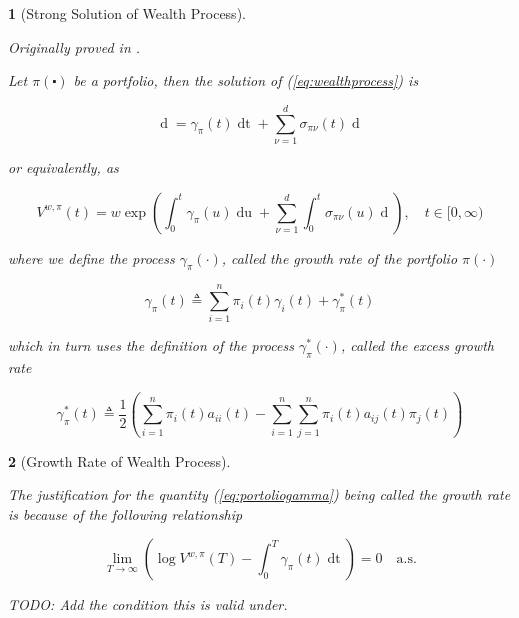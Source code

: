 \documentclass[british]{amsart}
\numberwithin{equation}{section}
\numberwithin{figure}{section}
\theoremstyle{plain}
\newtheorem{thm}{\protect\theoremname}[section]
\theoremstyle{definition}
\theoremstyle{plain}
\theoremstyle{plain}
\theoremstyle{plain}
\newtheorem{prop}[thm]{\protect\propositionname}
\theoremstyle{remark}
\theoremstyle{plain}
\providecommand{\propositionname}{Proposition}
\providecommand{\theoremname}{Theorem}
\renewcommand{\d}[1]{\mathop{\mathrm{d}{#1}}}
\newcommand{\ranget}{t\in[0,\infty)}
\newcommand{\defeq}{\mathop{\triangleq}}
\newcommand{\almostsurely}{\text{a.s.}}
\begin{document}
\begin{prop} [Strong Solution of Wealth Process]
	\label{prop:solutionofwealthprocess}

	Originally proved in \cite{fernholz1999}. 

	Let $\pi(\centerdot)$ be a portfolio, then the solution of (\ref{eq:wealthprocess}) is

	\begin{equation}
		\d{V^{w,\pi}(t)} =  
				\gamma_{\pi}(t) \d{t} +
				\sum_{\nu=1}^{d} \sigma_{\pi\nu}(t) \d{W_{\nu}(t)}
	\end{equation}

	or equivalently, as

	\begin{equation}
		V^{w,\pi}(t) = w \exp{ 
			\left(
				\int_{0}^{t} \gamma_{\pi}(u) \d{u} +
				\sum_{\nu=1}^{d} \int_{0}^{t} \sigma_{\pi\nu}(u) \d{W_{\nu}(u)}
			\right)},
	\quad \ranget
	\end{equation}

	where we define the process $\gamma_{\pi}(\cdot)$, called the \textit{growth rate} of the 
	portfolio $\pi(\cdot)$

	\begin{equation}
		\label{eq:portfoliogamma}
		\gamma_{\pi}(t) \defeq \sum_{i=1}^{n} \pi_{i}(t)\gamma_{i}(t) + \gamma_{\pi}^{*}(t)
	\end{equation}

	which in turn uses the definition of the process $\gamma_{\pi}^{*}(\cdot)$, called the
	\textit{excess growth rate}

	\begin{equation}
		\gamma_{\pi}^{*}(t) \defeq \frac{1}{2} 
				\left(
					\sum_{i=1}^{n} \pi_{i}(t)a_{ii}(t) -
					\sum_{i=1}^{n} \sum_{j=1}^{n} \pi_{i}(t)a_{ij}(t)\pi_{j}(t)
				\right)
	\end{equation}

\end{prop}

\begin{thm} [Growth Rate of Wealth Process]
	\label{thm:wealthgrowthrate}

	The justification for the quantity (\ref{eq:portoliogamma}) being called the 
	\textit{growth rate} is	because of the following relationship

	\begin{equation}
		\lim_{T \to \infty} 
			\left( 
			\log{V^{w,\pi}(T)} - \int_{0}^{T} \gamma_{\pi}(t)\d{t} 
			\right) = 0
		\quad \almostsurely
	\end{equation}

	TODO: Add the condition this is valid under.

\end{thm}
\end{document}
